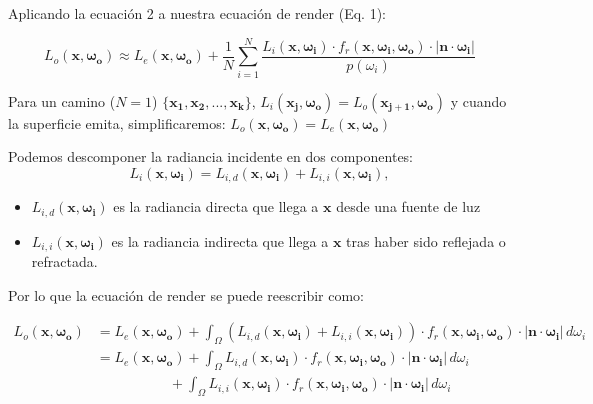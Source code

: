 \documentclass{article}
\begin{document}
Aplicando la ecuación 2 a nuestra ecuación de render (Eq. 1):

\begin{equation}
  L_o(\mathbf{x}, \mathbf{\omega_{o}}) \approx L_e(\mathbf{x}, \mathbf{\omega_{o}}) + \frac{1}{N} \sum_{i=1}^{N} \frac{L_i(\mathbf{x}, \mathbf{\omega_{i}}) \cdot f_r(\mathbf{x}, \mathbf{\omega_{i}}, \mathbf{\omega_{o}}) \cdot  |\mathbf{n} \cdot \mathbf{\omega_{i}}|}{p(\omega_{i})}
\end{equation}

Para un camino (\(N=1\))
\(\{\mathbf{x_{1}}, \mathbf{x_{2}}, ..., \mathbf{x_{k}}\}\),
\(L_{i}(\mathbf{x_{j}}, \mathbf{\omega_{o}})=L_{o}(\mathbf{x_{j+1}}, \mathbf{\omega_{o}})\)
y cuando la superficie emita, simplificaremos:
\(L_{o}(\mathbf{x}, \mathbf{\omega_{o}})=L_{e}(\mathbf{x}, \mathbf{\omega_{o}})\)

Podemos descomponer la radiancia incidente en dos componentes:
\[L_i(\mathbf{x}, \mathbf{\omega_{i}}) = L_{i,d}(\mathbf{x}, \mathbf{\omega_{i}}) + L_{i,i}(\mathbf{x}, \mathbf{\omega_{i}}),\]

\begin{itemize}
  \item \(L_{i,d}(\mathbf{x}, \mathbf{\omega_{i}})\) es la radiancia directa que
        llega a \(\mathbf{x}\) desde una fuente de luz
  \item \(L_{i,i}(\mathbf{x}, \mathbf{\omega_{i}})\) es la radiancia indirecta
        que llega a \(\mathbf{x}\) tras haber sido reflejada o refractada.
\end{itemize}

Por lo que la ecuación de render se puede reescribir como:

\begin{equation}
  \begin{split}
    L_o(\mathbf{x}, \mathbf{\omega_{o}}) & = L_e(\mathbf{x}, \mathbf{\omega_{o}}) + \int_{\Omega} (L_{i,d}(\mathbf{x}, \mathbf{\omega_{i}}) + L_{i,i}(\mathbf{x}, \mathbf{\omega_{i}})) \cdot f_r(\mathbf{x}, \mathbf{\omega_{i}}, \mathbf{\omega_{o}}) \cdot  |\mathbf{n} \cdot \mathbf{\omega_{i}}| \, d\omega_{i} \\
                                         & = L_e(\mathbf{x}, \mathbf{\omega_{o}})
                                           + \int_{\Omega} L_{i,d}(\mathbf{x}, \mathbf{\omega_{i}}) \cdot f_r(\mathbf{x}, \mathbf{\omega_{i}}, \mathbf{\omega_{o}}) \cdot  |\mathbf{n} \cdot \mathbf{\omega_{i}}| \, d\omega_{i} \\
                                         &\quad\quad\quad\quad\quad\  + \int_{\Omega} L_{i,i}(\mathbf{x}, \mathbf{\omega_{i}}) \cdot f_r(\mathbf{x}, \mathbf{\omega_{i}}, \mathbf{\omega_{o}}) \cdot  |\mathbf{n} \cdot \mathbf{\omega_{i}}| \, d\omega_{i} \\
  \end{split}
\end{equation}
\end{document}
